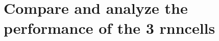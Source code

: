 \documentclass{elegantbook}
\begin{document}

\section{Compare and analyze the performance of the 3 rnncells}
\end{document}
